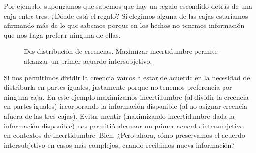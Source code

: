 \documentclass[a4paper,11pt]{book}
\theoremstyle{definition}
\newif\ifen
\newif\ifes
\newcommand{\En}[1]{\ifen#1\fi}
\newcommand{\Es}[1]{\ifes#1\fi}
\begin{document}
Por ejemplo, supongamos que sabemos que hay un regalo escondido detrás de una caja entre tres.
%
¿Dónde está el regalo?
%
Si elegimos alguna de las cajas estaríamos afirmando más de lo que sabemos porque en los hechos no tenemos información que nos haga preferir ninguna de ellas.
\begin{figure}[ht!]
 \centering
 \begin{subfigure}[b]{0.48\textwidth}
 \centering
    \caption{\En{Full certainty}}
    \label{fig:preferencia_parcial}
 \end{subfigure}
 \begin{subfigure}[b]{0.48\textwidth}
 \centering
    \caption{\En{Maximum uncertainty}}
    \label{fig:preferencia_total}
 \end{subfigure}
\caption{
Dos distribución de creencias. Maximizar incertidumbre permite alcanzar un primer acuerdo intersubjetivo.
}
 \label{fig:distribucion_de_creencias}
\end{figure}
\noindent
%
Si nos permitimos dividir la creencia vamos a estar de acuerdo en la necesidad de distriburla en partes iguales, justamente porque no tenemos preferencia por ninguna caja.
%
En este ejemplo maximizamos incertidumbre (al dividir la creencia en partes iguales) incorporando la información disponible (al no asignar creencia afuera de las tres cajas).
%
Evitar mentir (maximizando incertidumbre dada la información disponible) nos permitió alcanzar un primer acuerdo intersubjetivo en contextos de incertidumbre!
%
Bien. ¿Pero ahora, cómo preservamos el acuerdo intersubjetivo en casos más complejos, cuando recibimos nueva información?
\end{document}
